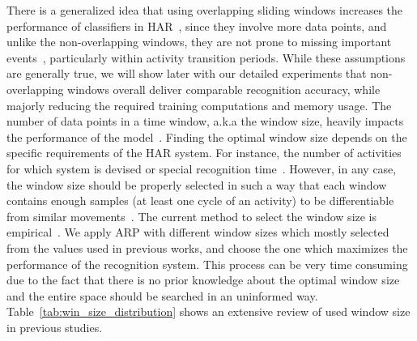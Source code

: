 There is a generalized idea that using overlapping sliding windows increases the performance of classifiers in HAR~\citep{janidarmian2014automated}, since they involve more data points, and unlike the non-overlapping windows, they are not prone to missing important events~\citep{coggeshall2005asset}, particularly within activity transition periods. While these assumptions are generally true, we will show later with our detailed experiments that non-overlapping windows overall deliver comparable recognition accuracy, while majorly reducing the required training computations and memory usage.
The number of data points in a time window, a.k.a the window size, heavily impacts the 
performance of the model~\citep{bulling2014tutorial,banos2014window}. Finding the optimal window size depends on the specific requirements of the HAR system. For instance, the number of activities for which system is devised or special recognition time~\citep{banos2014window}. However, in any case, the window size should be properly selected in such a way that each window contains enough samples (at least one cycle of an activity) to be differentiable from similar movements~\citep{janidarmian2017comprehensive}. The current method 
to select the window size is empirical~\citep{bulling2014tutorial}. We apply ARP with different window sizes which mostly selected from the values used in previous works, and choose the one which maximizes the performance of the recognition system. This process can be very time consuming due to the fact that there is no prior knowledge about the optimal window size and the entire space should be searched in an uninformed way. Table~\ref{tab:win_size_distribution} shows an extensive review of used window size in previous studies. 




